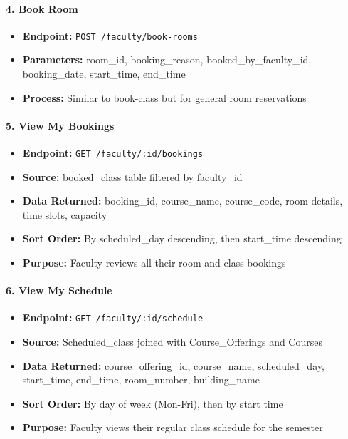 \documentclass[12pt]{article}
\begin{document}
\paragraph{4. Book Room}
\begin{itemize}
    \item \textbf{Endpoint:} \texttt{POST /faculty/book-rooms}
    \item \textbf{Parameters:} room\_id, booking\_reason, booked\_by\_faculty\_id, booking\_date, start\_time, end\_time
    \item \textbf{Process:} Similar to book-class but for general room reservations
\end{itemize}

\paragraph{5. View My Bookings}
\begin{itemize}
    \item \textbf{Endpoint:} \texttt{GET /faculty/:id/bookings}
    \item \textbf{Source:} booked\_class table filtered by faculty\_id
    \item \textbf{Data Returned:} booking\_id, course\_name, course\_code, room details, time slots, capacity
    \item \textbf{Sort Order:} By scheduled\_day descending, then start\_time descending
    \item \textbf{Purpose:} Faculty reviews all their room and class bookings
\end{itemize}

\paragraph{6. View My Schedule}
\begin{itemize}
    \item \textbf{Endpoint:} \texttt{GET /faculty/:id/schedule}
    \item \textbf{Source:} Scheduled\_class joined with Course\_Offerings and Courses
    \item \textbf{Data Returned:} course\_offering\_id, course\_name, scheduled\_day, start\_time, end\_time, room\_number, building\_name
    \item \textbf{Sort Order:} By day of week (Mon-Fri), then by start time
    \item \textbf{Purpose:} Faculty views their regular class schedule for the semester
\end{itemize}
\end{document}
